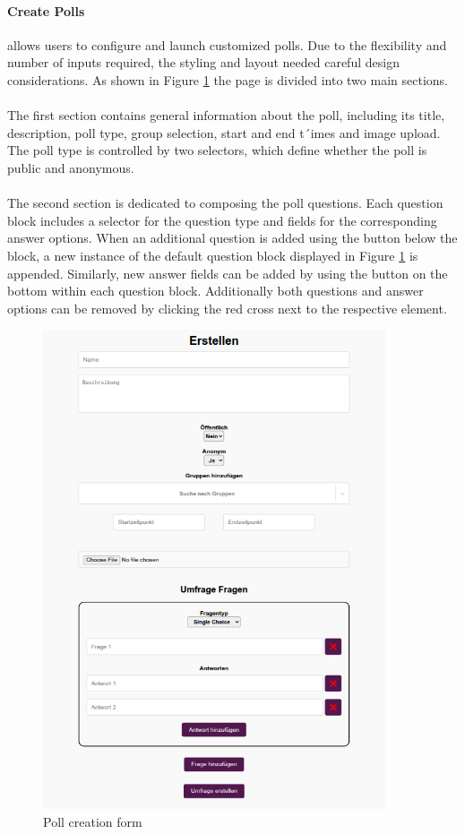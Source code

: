 \documentclass[a4paper,12pt]{report}
\begin{document}
\paragraph{Create Polls} allows users to configure and launch customized polls. Due to the flexibility and number of inputs required, the styling and layout needed careful design considerations. As shown in Figure \ref{fig:create_view} the page is divided into two main sections. \\\\
The first section contains general information about the poll, including its title, description, poll type, group selection, start and end t´imes and image upload. The poll type is controlled by two selectors, which define whether the poll is public and anonymous. \\\\ 
The second section is dedicated to composing the poll questions. Each question block includes a selector for the question type and fields for the corresponding answer options. When an additional question is added using the button below the block, a new instance of the default question block displayed in Figure \ref{fig:create_view} is appended. Similarly, new answer fields can be added by using the button on the bottom within each question block. Additionally both questions and answer options can be removed by clicking the red cross next to the respective element.
\begin{figure}[H]
	\centering
	\includegraphics[width=0.9\textwidth]{pics/create_view.png}
	\caption{Poll creation form}
	\label{fig:create_view}
\end{figure}
\end{document}
